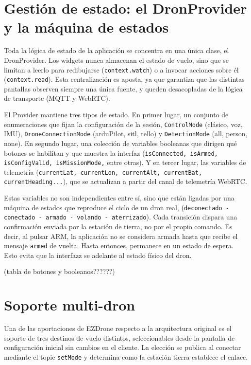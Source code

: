 \section{Gestión de estado: el DronProvider y la máquina de estados}
Toda la lógica de estado de la aplicación se concentra en una única clase, el DronProvider. Los widgets nunca almacenan el estado de vuelo, sino que se limitan a leerlo para redibujarse (\texttt{context.watch}) o a invocar acciones sobre él (\texttt{context.read}). Esta centralización es aposta, ya que garantiza que las distintas pantallas observen siempre una única fuente, y queden desacopladas de la lógica de transporte (MQTT y WebRTC).

El Provider mantiene tres tipos de estado. En primer lugar, un conjunto de enumeraciones que fijan la configuración de la sesión, \texttt{ControlMode} (clásico, voz, IMU), \texttt{DroneConnectionMode} (arduPilot, sitl, tello) y \texttt{DetectionMode} (all, person, none). En segundo lugar, una colección de variables booleanas que dirigen qué botones se habilitan y que muestra la interfaz (\texttt{isConnected, isArmed, isConfigValid, isMissionMode,} entre otras). Y en tercer lugar, las variables de telemetría (\texttt{currentLat, currentLon, currentAlt, currentBat, currentHeading...}), que se actualizan a partir del canal de telemetría WebRTC.

Estas variables no son independientes entre sí, sino que están ligadas por una máquina de estados que reproduce el ciclo de un dron real, (\texttt{deconectado - conectado - armado - volando - aterrizado}). Cada transición dispara una confirmación enviada por la estación de tierra, no por el propio comando. Es decir, al pulsar ARM, la aplicación no se considera armada hasta que recibe el mensaje \texttt{armed} de vuelta. Hasta entonces, permanece en un estado de espera. Esto evita que la interfazz se adelante al estado físico del dron.  

(tabla de botones y booleanos??????)

\section{Soporte multi-dron}
Una de las aportaciones de EZDrone respecto a la arquitectura original es el soporte de tres destinos de vuelo distintos, seleccionables desde la pantalla de configuración inicial sin cambios en el cliente. La elección se publica al conectar mediante el topic \texttt{setMode} y determina como la estación tierra establece el enlace.

